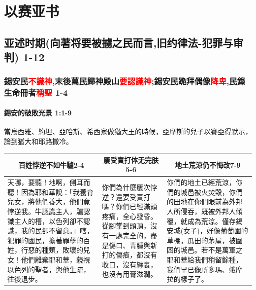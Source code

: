 
\chapter{以赛亚书}

\section{亚述时期(向著将要被擄之民而言,旧约律法-犯罪与审判) 1-12}

\subsection{錫安民\textcolor{red}{不識神},末後萬民歸神殿山\textcolor{red}{要認識神};錫安民跪拜偶像\textcolor{red}{降卑},民錄生命冊者\textcolor{red}{稱聖} 1-4}
\subsubsection{錫安的破敗光景 1:1-9}
當烏西雅、約坦、亞哈斯、希西家做猶大王的時候，亞摩斯的兒子以賽亞得默示，論到猶大和耶路撒冷。




\begin{table}[H]
\centering 
\begin{tabular}{p{6.5cm}|p{4.25cm}|p{6.25cm}}\hline\hline
\multicolumn{1}{c|}{百姓悖逆不如牛驢2-4}&\multicolumn{1}{c|}{屢受責打体无完肤5-6}&\multicolumn{1}{c}{地土荒涼仍不悔改7-9}\\\hline
天哪，要聽！地啊，側耳而聽！因為耶和華說：「我養育兒女，將他們養大，他們竟悖逆我。牛認識主人，驢認識主人的槽，以色列卻不認識，我的民卻不留意。」嗐，犯罪的國民，擔著罪孽的百姓，行惡的種類，敗壞的兒女！他們離棄耶和華，藐視以色列的聖者，與他生疏，往後退步。
&你們為什麼屢次悖逆？還要受責打嗎？你們已經滿頭疼痛，全心發昏。從腳掌到頭頂，沒有一處完全的，盡是傷口、青腫與新打的傷痕，都沒有收口，沒有纏裹，也沒有用膏滋潤。
&你們的地土已經荒涼，你們的城邑被火焚毀，你們的田地在你們眼前為外邦人所侵吞，既被外邦人傾覆，就成為荒涼。僅存錫安城(女子)，好像葡萄園的草棚，瓜田的茅屋，被圍困的城邑。若不是萬軍之耶和華給我們稍留餘種，我們早已像所多瑪、蛾摩拉的樣子了。\\\hline
\end{tabular}
\end{table}

